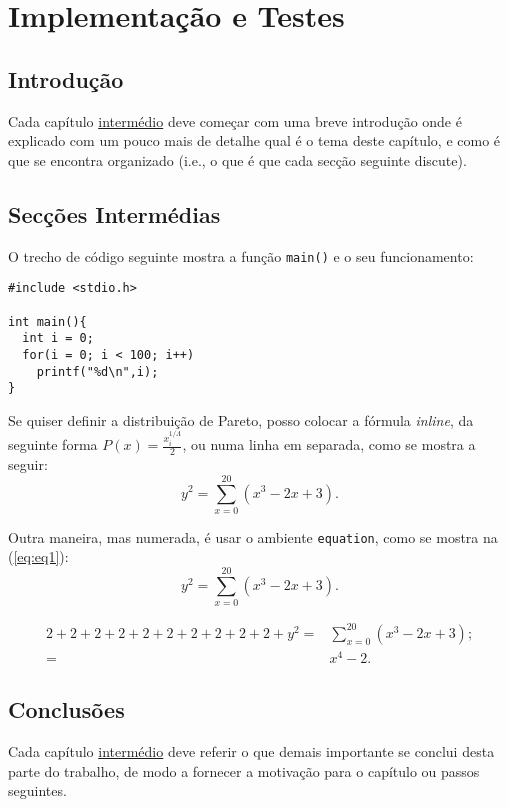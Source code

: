 \chapter{Implementação e Testes}
\label{chap:imp-test}

\section{Introdução}
\label{chap4:sec:intro}
Cada capítulo \underline{intermédio} deve começar com uma breve introdução onde é explicado com um pouco mais de detalhe qual é o tema deste capítulo, e como é que se encontra organizado (i.e., o que é que cada secção seguinte discute).

\section{Secções Intermédias}
\label{chap4:sec:...}

O trecho de código seguinte mostra a função \texttt{main()} e o seu funcionamento:
\begin{lstlisting}[caption=Trecho de código usado no projeto.]
#include <stdio.h>

int main(){
  int i = 0;
  for(i = 0; i < 100; i++)
    printf("%d\n",i);
}
\end{lstlisting}


Se quiser definir a distribuição de Pareto, posso colocar a fórmula \emph{inline}, da seguinte forma $P(x)=\frac{x^{1/\Lambda}_{i}}{2}$, ou numa linha em separada, como se mostra a seguir:
$$ y^2 = \sum_{x=0}^{20}( x^3 - 2x + 3).$$

Outra maneira, mas numerada, é usar o ambiente \texttt{equation}, como se mostra na (\ref{eq:eq1}):
\begin{equation}
 y^2 = \sum_{x=0}^{20}( x^3 - 2x + 3).
 \label{eq:eq1}
\end{equation}

\begin{align}
 2+2+2+2+2+2+2+2+2+2+y^2 = & \sum_{x=0}^{20}( x^3 - 2x + 3);\\
                         = & x^4 -2.
 \label{eq:eq2}
\end{align}


\section{Conclusões}
\label{chap4:sec:concs}
Cada capítulo \underline{intermédio} deve referir o que demais importante se conclui desta parte do trabalho, de modo a fornecer a motivação para o capítulo ou passos seguintes.